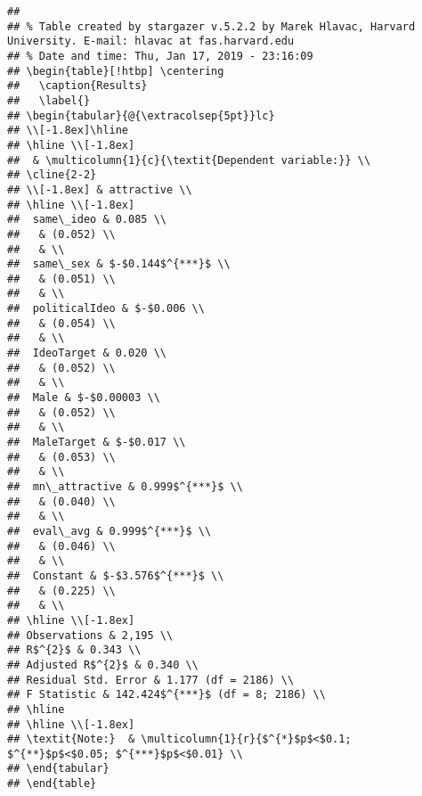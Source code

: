 \documentclass[]{article}
\begin{document}
\begin{verbatim}
## 
## % Table created by stargazer v.5.2.2 by Marek Hlavac, Harvard University. E-mail: hlavac at fas.harvard.edu
## % Date and time: Thu, Jan 17, 2019 - 23:16:09
## \begin{table}[!htbp] \centering 
##   \caption{Results} 
##   \label{} 
## \begin{tabular}{@{\extracolsep{5pt}}lc} 
## \\[-1.8ex]\hline 
## \hline \\[-1.8ex] 
##  & \multicolumn{1}{c}{\textit{Dependent variable:}} \\ 
## \cline{2-2} 
## \\[-1.8ex] & attractive \\ 
## \hline \\[-1.8ex] 
##  same\_ideo & 0.085 \\ 
##   & (0.052) \\ 
##   & \\ 
##  same\_sex & $-$0.144$^{***}$ \\ 
##   & (0.051) \\ 
##   & \\ 
##  politicalIdeo & $-$0.006 \\ 
##   & (0.054) \\ 
##   & \\ 
##  IdeoTarget & 0.020 \\ 
##   & (0.052) \\ 
##   & \\ 
##  Male & $-$0.00003 \\ 
##   & (0.052) \\ 
##   & \\ 
##  MaleTarget & $-$0.017 \\ 
##   & (0.053) \\ 
##   & \\ 
##  mn\_attractive & 0.999$^{***}$ \\ 
##   & (0.040) \\ 
##   & \\ 
##  eval\_avg & 0.999$^{***}$ \\ 
##   & (0.046) \\ 
##   & \\ 
##  Constant & $-$3.576$^{***}$ \\ 
##   & (0.225) \\ 
##   & \\ 
## \hline \\[-1.8ex] 
## Observations & 2,195 \\ 
## R$^{2}$ & 0.343 \\ 
## Adjusted R$^{2}$ & 0.340 \\ 
## Residual Std. Error & 1.177 (df = 2186) \\ 
## F Statistic & 142.424$^{***}$ (df = 8; 2186) \\ 
## \hline 
## \hline \\[-1.8ex] 
## \textit{Note:}  & \multicolumn{1}{r}{$^{*}$p$<$0.1; $^{**}$p$<$0.05; $^{***}$p$<$0.01} \\ 
## \end{tabular} 
## \end{table}
\end{verbatim}
\end{document}
